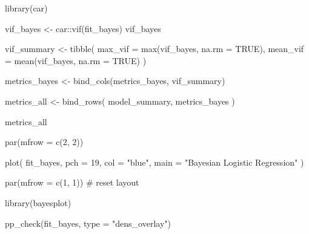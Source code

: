 \documentclass[
  letterpaper,
  DIV=11,
  numbers=noendperiod]{scrartcl}
\newenvironment{Shaded}{\begin{snugshade}}{\end{snugshade}}
\newcommand{\AttributeTok}[1]{\textcolor[rgb]{0.40,0.45,0.13}{#1}}
\newcommand{\CommentTok}[1]{\textcolor[rgb]{0.37,0.37,0.37}{#1}}
\newcommand{\ConstantTok}[1]{\textcolor[rgb]{0.56,0.35,0.01}{#1}}
\newcommand{\DecValTok}[1]{\textcolor[rgb]{0.68,0.00,0.00}{#1}}
\newcommand{\FunctionTok}[1]{\textcolor[rgb]{0.28,0.35,0.67}{#1}}
\newcommand{\NormalTok}[1]{\textcolor[rgb]{0.00,0.23,0.31}{#1}}
\newcommand{\OtherTok}[1]{\textcolor[rgb]{0.00,0.23,0.31}{#1}}
\newcommand{\SpecialCharTok}[1]{\textcolor[rgb]{0.37,0.37,0.37}{#1}}
\newcommand{\StringTok}[1]{\textcolor[rgb]{0.13,0.47,0.30}{#1}}
\begin{document}
\begin{Shaded}
\end{Shaded}

\begin{Shaded}
\begin{Highlighting}[]
\FunctionTok{library}\NormalTok{(car)}

\NormalTok{vif\_bayes }\OtherTok{\textless{}{-}}\NormalTok{ car}\SpecialCharTok{::}\FunctionTok{vif}\NormalTok{(fit\_bayes)}
\NormalTok{vif\_bayes}
\end{Highlighting}
\end{Shaded}

\begin{Shaded}
\begin{Highlighting}[]
\NormalTok{vif\_summary }\OtherTok{\textless{}{-}} \FunctionTok{tibble}\NormalTok{(}
  \AttributeTok{max\_vif  =} \FunctionTok{max}\NormalTok{(vif\_bayes, }\AttributeTok{na.rm =} \ConstantTok{TRUE}\NormalTok{),}
  \AttributeTok{mean\_vif =} \FunctionTok{mean}\NormalTok{(vif\_bayes, }\AttributeTok{na.rm =} \ConstantTok{TRUE}\NormalTok{)}
\NormalTok{)}
\end{Highlighting}
\end{Shaded}

\begin{Shaded}
\begin{Highlighting}[]
\NormalTok{metrics\_bayes }\OtherTok{\textless{}{-}} \FunctionTok{bind\_cols}\NormalTok{(metrics\_bayes, vif\_summary)}
\end{Highlighting}
\end{Shaded}

\begin{Shaded}
\begin{Highlighting}[]
\NormalTok{metrics\_all }\OtherTok{\textless{}{-}} \FunctionTok{bind\_rows}\NormalTok{(}
\NormalTok{  model\_summary,   }
\NormalTok{  metrics\_bayes}
\NormalTok{)}

\NormalTok{metrics\_all}
\end{Highlighting}
\end{Shaded}

\begin{Shaded}
\begin{Highlighting}[]
\FunctionTok{par}\NormalTok{(}\AttributeTok{mfrow =} \FunctionTok{c}\NormalTok{(}\DecValTok{2}\NormalTok{, }\DecValTok{2}\NormalTok{))}

\FunctionTok{plot}\NormalTok{(}
\NormalTok{  fit\_bayes,}
  \AttributeTok{pch =} \DecValTok{19}\NormalTok{,}
  \AttributeTok{col =} \StringTok{"blue"}\NormalTok{,}
  \AttributeTok{main =} \StringTok{"Bayesian Logistic Regression"}
\NormalTok{)}

\FunctionTok{par}\NormalTok{(}\AttributeTok{mfrow =} \FunctionTok{c}\NormalTok{(}\DecValTok{1}\NormalTok{, }\DecValTok{1}\NormalTok{))  }\CommentTok{\# reset layout}
\end{Highlighting}
\end{Shaded}

\begin{Shaded}
\begin{Highlighting}[]
\FunctionTok{library}\NormalTok{(bayesplot)}

\FunctionTok{pp\_check}\NormalTok{(fit\_bayes, }\AttributeTok{type =} \StringTok{"dens\_overlay"}\NormalTok{)}
\end{Highlighting}
\end{Shaded}
\end{document}

